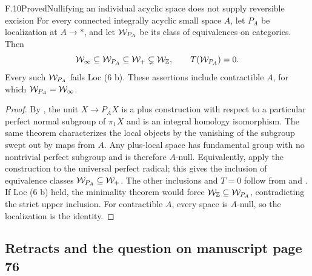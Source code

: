 \begin{claim}{F.10}{Proved}{Nullifying an individual acyclic space does not supply reversible excision}
For every connected integrally acyclic small space $A$, let $P_A$ be
localization at $A\to *$, and let $\mathcal{W}_{P_A}$ be its class of equivalences
on categories. Then
\[
 \mathcal{W}_{\infty}\subseteq\mathcal{W}_{P_A}\subseteq\mathcal{W}_+\subsetneq\mathcal{W}_{\mathbb Z},
 \qquad T(\mathcal{W}_{P_A})=0.
\]
Every such $\mathcal{W}_{P_A}$ fails Loc (6 b). These assertions include
contractible $A$, for which $\mathcal{W}_{P_A}=\mathcal{W}_{\infty}$.
\end{claim}
\begin{proof}
By \citet[Theorem 3.3]{FBerrickCasacuberta1999}, the unit
$X\to P_AX$ is a plus construction with respect to a particular perfect
normal subgroup of $\pi_1X$ and is an integral homology isomorphism.
The same theorem characterizes the local objects by the vanishing of the
subgroup swept out by maps from $A$. Any plus-local space has fundamental
group with no nontrivial perfect subgroup and is therefore $A$-null.
Equivalently, apply the construction to the universal perfect radical;
this gives the inclusion of equivalence classes
$\mathcal{W}_{P_A}\subseteq\mathcal{W}_+$. The other inclusions and $T=0$ follow from
 and . If Loc (6 b) held, the minimality
theorem  would force $\mathcal{W}_{\mathbb Z}\subseteq\mathcal{W}_{P_A}$, contradicting
the strict upper inclusion. For contractible $A$, every space is $A$-null,
so the localization is the identity.
\end{proof}

\subsection{Retracts and the question on manuscript page 76}

